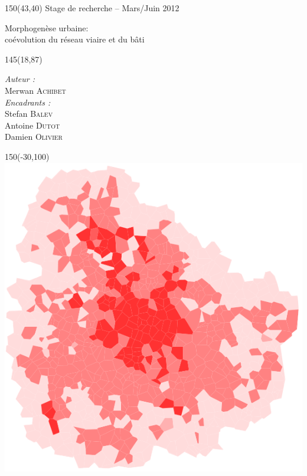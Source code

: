 \documentclass[10pt]{article}
\newenvironment{changemargin}[2]{
  \begin{list}{}{
      \setlength{\topsep}{0pt}
      \setlength{\leftmargin}{#1}
      \setlength{\rightmargin}{#2}
      \setlength{\listparindent}{\parindent}
      \setlength{\itemindent}{\parindent}
      \setlength{\parsep}{\parskip}
    }
  \item[]}{\end{list}
}
\begin{document}
\begin{titlepage}

  \begin{changemargin}{-1.6cm}{-1.6cm}

    \begin{textblock}{150}(43,40)
      Stage de recherche -- Mars/Juin 2012
    \end{textblock}

    \vphantom{a}
    \vphantom{a}

    \begin{center}
      {\sffamily \huge Morphogenèse urbaine:\\ coévolution du réseau viaire et du bâti}
    \end{center}

    \vphantom{a}
    \vphantom{a}

    \begin{textblock}{145}(18,87)
      \begin{flushright}
        \textit{Auteur :}\\
        Merwan {\scshape Achibet}\\[0.5cm]
        \textit{Encadrants :}\\
        Stefan {\scshape Balev}\\
        Antoine {\scshape Dutot}\\
        Damien {\scshape Olivier}
      \end{flushright}
    \end{textblock}

    \vfill

    \begin{textblock}{150}(-30,100)
      \includegraphics[]{images/cover.png}
    \end{textblock}

  \end{changemargin}

\end{titlepage}
\end{document}
